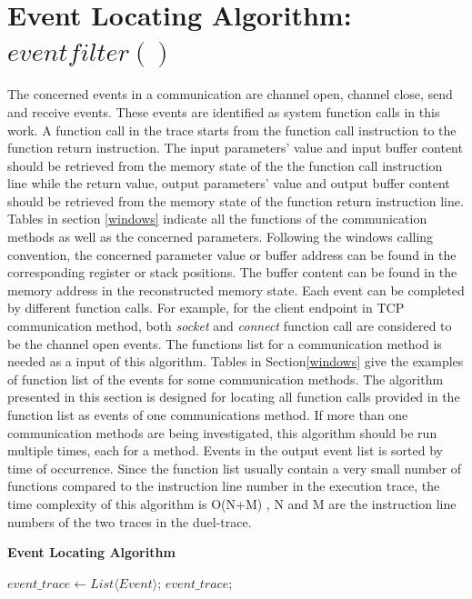 \section{Event Locating Algorithm: $eventfilter\left( \right)$}
The concerned events in a communication are channel open, channel close, send and receive events. These events are identified as system function calls in this work.  A function call in the trace starts from the function call instruction to the function return instruction. The input parameters' value and input buffer content should be retrieved from the memory state of the the function call instruction line while the return value, output parameters' value and output buffer content should be retrieved from the memory state of the function return instruction line. Tables in section \ref{windows} indicate all the functions of the communication methods as well as the concerned parameters. Following the windows calling convention, the concerned parameter value or buffer address can be found in the corresponding register or stack positions. The buffer content can be found in the memory address in the reconstructed memory state. Each event can be completed by different function calls. For example, for the client endpoint in TCP communication method, both  \textit{socket} and \textit{connect} function call are considered to be the channel open events. The functions list for a communication method is needed as a input of this algorithm. Tables in Section\ref{windows} give the examples of function list of the events for some communication methods. The algorithm presented in this section is designed for locating all function calls provided in the function list as events of one communications method. If more than one communication methods are being investigated, this algorithm should be run multiple times, each for a method. Events in the output event list is sorted by time of occurrence. Since the function list usually contain a very small number of functions compared to the instruction line number in the execution trace, the time complexity of this algorithm is O(N+M) , N and M are the instruction line numbers of the two traces in the duel-trace.

\begin{algorithm}[H]
\DontPrintSemicolon
\caption{{\bf Event Locating Algorithm} \label{eventLocAlg}}
$event\_trace \leftarrow List \langle Event\rangle$;\; 
\KwRet $event\_trace$;\;
\end{algorithm} 

